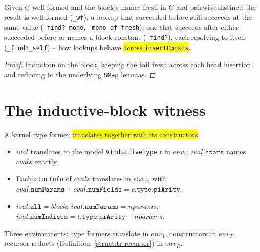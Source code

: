 \begin{lemma}
\label{family:insert-consts-lemmas}
\leanok
{}

 Given $C$ well-formed and the block's names fresh in $C$ and pairwise
distinct: the result is well-formed (\texttt{\_wf}); a lookup that succeeded before still
succeeds at the same value (\texttt{\_find?\_mono}, \texttt{\_mono\_of\_fresh}); one that
succeeds after either succeeded before or names a block constant (\texttt{\_find?}), each
resolving to itself (\texttt{\_find?\_self}) -- how lookups behave \hl{across
\texttt{insertConsts}}.
\end{lemma}
\begin{proof}
\leanok
{} Induction on the block, keeping the tail fresh across each head insertion and
reducing to the underlying \texttt{SMap} lemmas.
\end{proof}

\section{The inductive-block witness}

\begin{definition}
\label{struct:tr-ind-type}
\leanok
{}

 A kernel type former \hl{translates together with its constructors}.
\begin{itemize}
\item $ival$ translates to the model \texttt{VInductiveType} $t$ in $env_1$;
$ival.\mathtt{ctors}$ names $cvals$ exactly.
\item Each \texttt{ctorInfo} of $cvals$ translates in $env_T$, with
$cval.\mathtt{numParams} + cval.\mathtt{numFields} = c.\mathtt{type}.\mathtt{piArity}$.
\item $ival.\mathtt{all} = block$; $ival.\mathtt{numParams} = nparams$;
$ival.\mathtt{numIndices} = t.\mathtt{type}.\mathtt{piArity} - nparams$.
\end{itemize}
 Three environments: type formers translate in $env_1$, constructors in
$env_T$, recursor reducts (Definition~\ref{struct:tr-recursor}) in $env_R$.
\end{definition}


